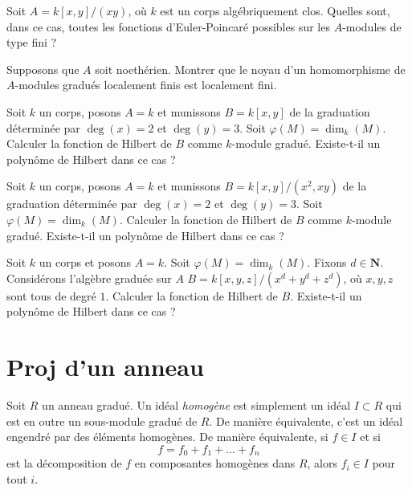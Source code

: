 \begin{exercise}
\label{exercise-Euler-Poincare-node}
Soit $A = k[x, y]/(xy)$, où $k$ est un corps algébriquement clos. Quelles sont, dans ce cas, toutes les
fonctions d'Euler-Poincar\'e possibles sur les $A$-modules de type fini ?
\end{exercise}

\begin{exercise}
\label{exercise-kernel-locally-finite}
Supposons que $A$ soit noethérien. Montrer que le noyau d'un homomorphisme
de $A$-modules gradués localement finis est localement fini.
\end{exercise}

\begin{exercise}
\label{exercise-no-hilbert}
Soit $k$ un corps, posons $A = k$ et munissons $B = k[x, y]$ de la graduation
déterminée par $\deg(x) = 2$ et $\deg(y) = 3$. Soit $\varphi(M) = \dim_k(M)$.
Calculer la fonction de Hilbert de $B$ comme $k$-module gradué. Existe-t-il
un polynôme de Hilbert dans ce cas ?
\end{exercise}

\begin{exercise}
\label{exercise-no-hilbert-or-is-there}
Soit $k$ un corps, posons $A = k$ et munissons $B = k[x, y]/(x^2, xy)$ de la graduation
déterminée par $\deg(x) = 2$ et $\deg(y) = 3$. Soit $\varphi(M) = \dim_k(M)$.
Calculer la fonction de Hilbert de $B$ comme $k$-module gradué. Existe-t-il
un polynôme de Hilbert dans ce cas ?
\end{exercise}

\begin{exercise}
\label{exercise-hilbert-to-compute}
Soit $k$ un corps et posons $A = k$. Soit $\varphi(M) = \dim_k(M)$.
Fixons $d\in {\mathbf N}$. Considérons l'algèbre graduée sur $A$
$B = k[x, y, z]/(x^d + y^d + z^d)$, où $x, y, z$ sont tous de degré $1$.
Calculer la fonction de Hilbert de $B$. Existe-t-il un polynôme de Hilbert
dans ce cas ?
\end{exercise}



\section{Proj d'un anneau}
\label{section-proj-ring}

\begin{definition}
\label{definition-homogeneous-ideal}
Soit $R$ un anneau gradué. Un idéal {\it homogène} est simplement un idéal
$I \subset R$ qui est en outre un sous-module gradué de $R$. De manière équivalente,
c'est un idéal engendré par des éléments homogènes. De manière équivalente, si
$f \in I$ et si
$$
f = f_0 + f_1 + \ldots + f_n
$$
est la décomposition de $f$ en composantes homogènes dans $R$, alors $f_i \in I$
pour tout $i$.
\end{definition}

